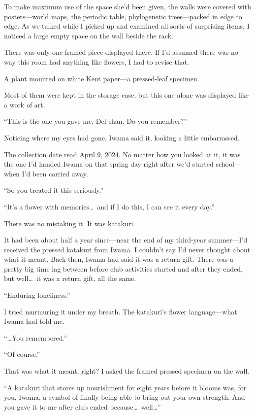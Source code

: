 \documentclass[
    a4paper,
    12pt,
    twoside,
    openany,
    UTF8,
    fontset=windows
]{ctexbook}
\begin{document}
To make maximum use of the space she'd been given, the walls were covered with posters---world maps, the periodic table, phylogenetic trees---packed in edge to edge. As we talked while I picked up and examined all sorts of surprising items, I noticed a large empty space on the wall beside the rack.

There was only one framed piece displayed there. If I'd assumed there was no way this room had anything like flowers, I had to revise that.

A plant mounted on white Kent paper---a pressed-leaf specimen.

Most of them were kept in the storage case, but this one alone was displayed like a work of art.

``This is the one you gave me, Del-chan. Do you remember?''

Noticing where my eyes had gone, Iwama said it, looking a little embarrassed.

The collection date read April 9, 2024. No matter how you looked at it, it was the one I'd handed Iwama on that spring day right after we'd started school---when I'd been carried away.

``So you treated it this seriously.''

``It's a flower with memories\dots\ and if I do this, I can see it every day.''

There was no mistaking it. It was katakuri.

It had been about half a year since---near the end of my third-year summer---I'd received the pressed katakuri from Iwama. I couldn't say I'd never thought about what it meant. Back then, Iwama had said it was a return gift. There was a pretty big time lag between before club activities started and after they ended, but well\dots\ it was a return gift, all the same.

``Enduring loneliness.''

I tried murmuring it under my breath. The katakuri's flower language---what Iwama had told me.

``\dots You remembered.''

``Of course.''

That was what it meant, right? I asked the framed pressed specimen on the wall.

``A katakuri that stores up nourishment for eight years before it blooms was, for you, Iwama, a symbol of finally being able to bring out your own strength. And you gave it to me after club ended because\dots\ well\dots''
\end{document}
